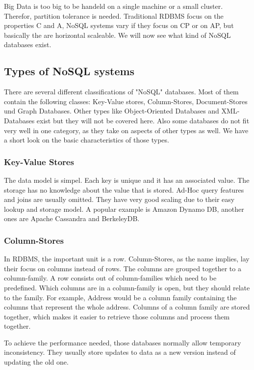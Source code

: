 \documentclass{acm_proc_article-sp}
\begin{document}
Big Data is too big to be handeld on a single machine or a small cluster. Therefor, partition tolerance is needed. Traditional RDBMS focus on the properties C and A, NoSQL systems vary if they focus on CP or on AP, but basically the are horizontal scaleable. We will now see what kind of NoSQL databases exist.

\subsection{Types of NoSQL systems}

There are several different classifications of "NoSQL" databases. Most of them contain the following classes: Key-Value stores, Column-Stores, Document-Stores und Graph Databases. Other types like Object-Oriented Databases and XML-Databases exist but they will not be covered here. Also some databases do not fit very well in one category, as they take on aspects of other types as well. We have a short look on the basic characteristics of those types.

\subsubsection{Key-Value Stores}

The data model is simpel. Each key is unique and it has an associated value. The storage has no knowledge about the value that is stored. Ad-Hoc query features and joins are usually omitted. They have very good scaling due to their easy lookup and storage model. A popular example is Amazon Dynamo DB, another ones are Apache Cassandra and BerkeleyDB\cite{Nayak_typeof}.
	
\subsubsection{Column-Stores}

In RDBMS, the important unit is a row. Column-Stores, as the name implies, lay their focus on columns instead of rows. The columns are grouped together to a column-family. A row consists out of column-families which need to be predefined. Which columns are in a column-family is open, but they should relate to the family. For example, Address would be a column family containing the columns that represent the whole address. Columns of a column family are stored together, which makes it easier to retrieve those columns and process them together.

To achieve the performance needed, those databases normally allow temporary inconsistency. They usually store updates to data as a new version instead of updating the old one.
\end{document}
